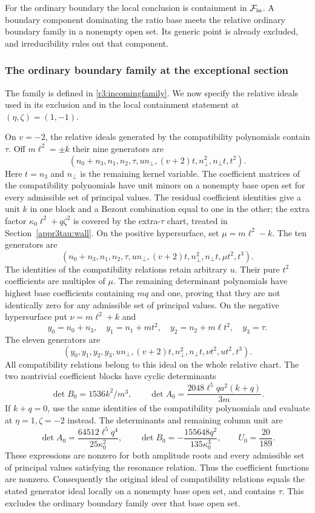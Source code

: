 \documentclass[11pt,a4paper]{article}
\numberwithin{equation}{section}
\theoremstyle{plain}
\theoremstyle{definition}
\theoremstyle{remark}
\begin{document}
For the ordinary boundary the local conclusion is containment in
$\mathcal F_{\rm in}$. A boundary component dominating the ratio base meets the relative ordinary boundary family in a nonempty open set. Its generic point is already excluded, and irreducibility rules out that component. 

\subsubsection{The ordinary boundary family at the exceptional section}
The family is defined in \eqref{r3:incomingfamily}. We now specify the
relative ideals used in its exclusion and in the local containment
statement at $(\eta ,\zeta )=(1,-1)$.

On $v=-2$, the relative ideals generated by the compatibility polynomials contain $\tau$.
Off $m\ell^2=\pm k$ their nine generators are
\[
 (n_0+n_3,n_1,n_2,\tau,un_\perp,(v+2)t,n_\perp^2,n_\perp t,t^2).
\]
Here $t=n_3$ and $n_\perp$ is the remaining kernel variable.
The coefficient matrices of the compatibility polynomials have unit minors on a nonempty
base open set for every admissible set of principal values. The residual coefficient identities
give a unit $k$ in one block and a Bezout combination equal to one in
the other; the extra factor $\kappa_0 \ell^2+q\zeta ^2$ is covered by the extra-$\tau$
chart, treated in Section~\ref{appr3tau:wall}.
On the positive hypersurface, set $\mu=m\ell^2-k$. The ten generators are
\[
 (n_0+n_3,n_1,n_2,\tau,un_\perp,(v+2)t,n_\perp^2,n_\perp t,\mu t^2,t^3).
\]
The identities of the compatibility relations retain arbitrary $u$. Their pure $t^2$ coefficients are multiples of $\mu$.
The remaining determinant polynomials have highest base coefficients
containing $mq$ and one, proving that they are not identically zero for
any admissible set of principal values. On the negative hypersurface put $\nu=m\ell^2+k$ and
\[
 y_0=n_0+n_3,\quad y_1=n_1+mt^2,\quad
 y_2=n_2+m\ell t^2,\quad y_3=\tau.
\]
The eleven generators are
\[
 (y_0,y_1,y_2,y_3,un_\perp,(v+2)t,n_\perp^2,n_\perp t,\nu t^2,ut^2,t^3).
\]
All compatibility relations belong to this ideal on the whole relative chart.
The two nontrivial coefficient blocks have cyclic determinants
\[
 \det B_0=1536k^2/m^3,\qquad
 \det A_0=\frac{2048\ell^5qa^2(k+q)}{3m}.
\]
If $k+q=0$, use the same identities of the compatibility polynomials and evaluate at
$\eta =1,\zeta =-2$ instead. The determinants and remaining column unit are
\[
 \det A_0=\frac{64512\ell^5q^4}{25\kappa_0 ^2},\qquad
 \det B_0=-\frac{155648q^2}{135\kappa_0 ^3},\qquad U_0=\frac{20}{189}.
\]
These expressions are nonzero for both amplitude roots and every
admissible set of principal values satisfying the resonance relation. Thus the coefficient functions are nonzero. Consequently the original
ideal of compatibility relations equals the stated generator ideal locally on a nonempty
base open set, and contains $\tau$. This excludes the ordinary boundary family over that base open set.
\end{document}
